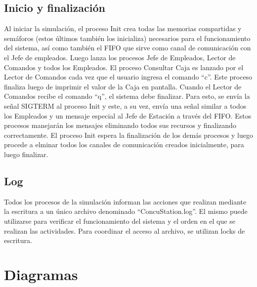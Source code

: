 \documentclass{article}
\begin{document}
\subsection{Inicio y finalización}
Al iniciar la simulación, el proceso Init crea todas las memorias compartidas y semáforos (estos últimos también los inicializa) necesarios para el funcionamiento del sistema, así como también el FIFO que sirve como canal de comunicación con el Jefe de empleados. Luego lanza los procesos Jefe de Empleados, Lector de Comandos y todos los Empleados. El proceso Consultar Caja es lanzado por el Lector de Comandos cada vez que el usuario ingresa el comando ``c''. Este proceso finaliza luego de imprimir el valor de la Caja en pantalla.
Cuando el Lector de Comandos recibe el comando ``q'', el sistema debe finalizar. Para esto, se envía la señal SIGTERM al proceso Init y este, a su vez, envía una señal similar a todos los Empleados y un mensaje especial al Jefe de Estación a través del FIFO. Estos procesos manejarán los mensajes eliminando todos sus recursos y finalizando correctamente. El proceso Init espera la finalización de los demás procesos y luego procede a elminar todos los canales de comunicación creados inicialmente, para luego finalizar.
\subsection{Log}
Todos los procesos de la simulación informan las acciones que realizan mediante la escritura a un único archivo denominado ``ConcuStation.log''. El mismo puede utilizarse para verificar el funcionamiento del sistema y el orden en el que se realizan las actividades. Para coordinar el acceso al archivo, se utilizan locks de escritura.

\section{Diagramas}
\end{document}
